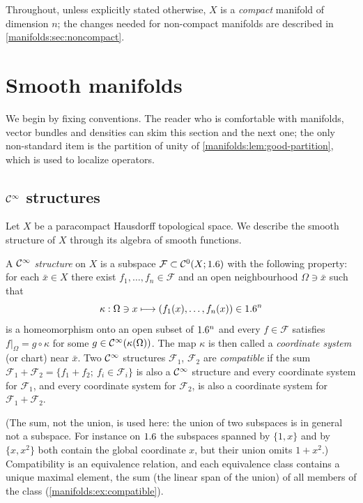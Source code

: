 Throughout, unless explicitly stated otherwise, $X$ is a \emph{compact}
manifold of dimension $n$; the changes needed for non-compact manifolds are
described in \cref{manifolds:sec:noncompact}.

\section{Smooth manifolds}\label{manifolds:sec:manifolds}
We begin by fixing conventions. The reader who is comfortable with manifolds,
vector bundles and densities can skim this section and the next one; the only
non-standard item is the partition of unity of
\cref{manifolds:lem:good-partition}, which is used to localize operators.

\subsection{$\mathcal{C}^\infty$ structures}
Let $X$ be a paracompact Hausdorff topological space. We describe the smooth
structure of $X$ through its algebra of smooth functions.

\begin{definition}\label{manifolds:def:structure}
A \emph{$\mathcal{C}^\infty$ structure} on $X$ is a subspace $\mathcal F\subset\mathcal{C}^0(X;1.6)$
with the following property: for each $\bar x\in X$ there exist
$f_1,\dots,f_n\in\mathcal F$ and an open neighbourhood $\Omega\ni\bar x$ such
that
\begin{equation}\label{manifolds:eq:coord}
\kappa:\Omega\ni x\longmapsto (f_1(x),\dots,f_n(x))\in1.6^n
\end{equation}
is a homeomorphism onto an open subset of $1.6^n$ and every $f\in\mathcal F$
satisfies $f|_{\Omega}=g\circ\kappa$ for some $g\in\mathcal{C}^\infty(\kappa(\Omega))$. The map
$\kappa$ is then called a \emph{coordinate system} (or chart) near $\bar x$.
Two $\mathcal{C}^\infty$ structures $\mathcal F_1$, $\mathcal F_2$ are \emph{compatible} if
the sum $\mathcal F_1+\mathcal F_2=\{f_1+f_2;\ f_i\in\mathcal F_i\}$ is also a
$\mathcal{C}^\infty$ structure and every coordinate system for $\mathcal F_1$, and every
coordinate system for $\mathcal F_2$, is also a coordinate system for
$\mathcal F_1+\mathcal F_2$.
\end{definition}

(The sum, not the union, is used here: the union of two subspaces is in
general not a subspace. For instance on $1.6$ the subspaces spanned by
$\{1,x\}$ and by $\{x,x^2\}$ both contain the global coordinate $x$, but their
union omits $1+x^2$.) Compatibility is an equivalence relation, and each
equivalence class contains a unique maximal element, the sum (the linear span
of the union) of all members of the class (\cref{manifolds:ex:compatible}).

